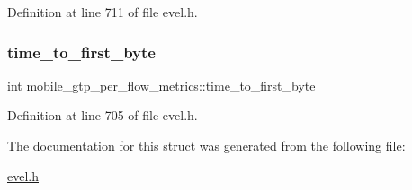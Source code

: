Definition at line 711 of file evel.\+h.

\hypertarget{structmobile__gtp__per__flow__metrics_aac074434132cd43e1e717ad9f4dc7126}{}\label{structmobile__gtp__per__flow__metrics_aac074434132cd43e1e717ad9f4dc7126} 
\subsubsection{\texorpdfstring{time\+\_\+to\+\_\+first\+\_\+byte}{time\_to\_first\_byte}}
{\footnotesize\ttfamily int mobile\+\_\+gtp\+\_\+per\+\_\+flow\+\_\+metrics\+::time\+\_\+to\+\_\+first\+\_\+byte}



Definition at line 705 of file evel.\+h.



The documentation for this struct was generated from the following file\+:\begin{DoxyCompactItemize}
\item 
\hyperlink{evel_8h}{evel.\+h}\end{DoxyCompactItemize}
